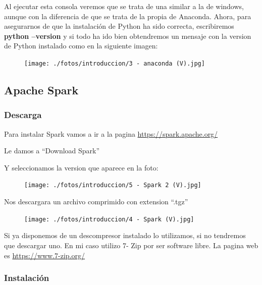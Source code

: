 \documentclass[a4paper,10pt]{article}
\begin{document}
Al ejecutar esta consola veremos que se trata de una similar a la de windows, aunque con la diferencia de que se trata de la propia de Anaconda. Ahora, para asegurarnos de que la instalación de Python ha sido correcta, escribiremos \textbf{python --version}
y si todo ha ido bien obtendremos un mensaje con la version de Python instalado como en la siguiente imagen: 

\begin{figure}[H]
\begin{center}
\texttt{[image: ./fotos/introduccion/3 - anaconda (V).jpg]}
\end{center}
\end{figure}



\subsection{Apache Spark}

\subsubsection{Descarga}

Para instalar Spark vamos a ir a la pagina \href{https://spark.apache.org/}{https://spark.apache.org/}  

Le damos a “Download Spark” 

Y seleccionamos la version que aparece en la foto: 

\begin{figure}[H]
\begin{center}
\texttt{[image: ./fotos/introduccion/5 - Spark 2 (V).jpg]}
\end{center}
\end{figure}

Nos descargara un archivo comprimido con extension “.tgz” 

\begin{figure}[H]
\begin{center}
\texttt{[image: ./fotos/introduccion/4 - Spark (V).jpg]}
\end{center}
\end{figure}

Si ya disponemos de un descompresor instalado lo utilizamos, si no tendremos que descargar uno. En mi caso utilizo 7- Zip por ser software libre. La pagina web es \href{https://www.7-zip.org/}{https://www.7-zip.org/}    

\subsubsection{Instalación}
\end{document}
